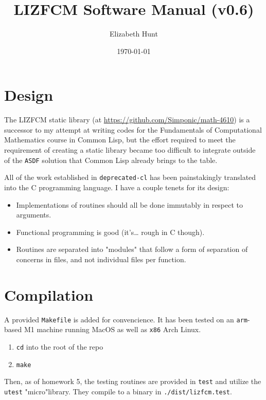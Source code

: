 \documentclass[11pt]{article}
\author{Elizabeth Hunt}
\date{\today}
\title{LIZFCM Software Manual (v0.6)}
\begin{document}
\maketitle
\tableofcontents

\setlength\parindent{0pt}

\section{Design}
\label{sec:org63deaf6}
The LIZFCM static library (at \url{https://github.com/Simponic/math-4610}) is a successor to my
attempt at writing codes for the Fundamentals of Computational Mathematics course in Common
Lisp, but the effort required to meet the requirement of creating a static library became
too difficult to integrate outside of the \texttt{ASDF} solution that Common Lisp already brings
to the table.

All of the work established in \texttt{deprecated-cl} has been painstakingly translated into
the C programming language. I have a couple tenets for its design:

\begin{itemize}
\item Implementations of routines should all be done immutably in respect to arguments.
\item Functional programming is good (it's\ldots{} rough in C though).
\item Routines are separated into "modules" that follow a form of separation of concerns
in files, and not individual files per function.
\end{itemize}

\section{Compilation}
\label{sec:org7291327}
A provided \texttt{Makefile} is added for convencience. It has been tested on an \texttt{arm}-based M1 machine running
MacOS as well as \texttt{x86} Arch Linux.

\begin{enumerate}
\item \texttt{cd} into the root of the repo
\item \texttt{make}
\end{enumerate}

Then, as of homework 5, the testing routines are provided in \texttt{test} and utilize the
\texttt{utest} "micro"library. They compile to a binary in \texttt{./dist/lizfcm.test}.
\end{document}
